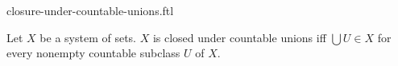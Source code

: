 \documentclass{naproche-library}
\begin{document}
\begin{smodule}[title=Closure Under Countable Unions]{closure-under-countable-unions.ftl}

\begin{definition}[forthel,id=FOUNDATIONS_14_2377279311183872]
  Let $X$ be a system of sets.
  $X$ is closed under countable unions iff $\bigcup U \in X$ for every nonempty countable subclass $U$ of $ X$.
\end{definition}
\end{smodule}
\end{document}
